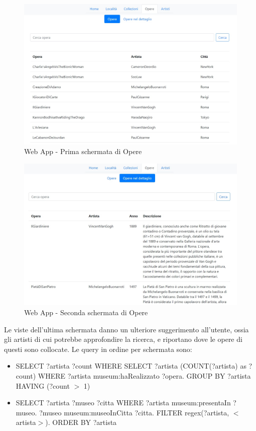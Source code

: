 \documentclass[12pt]{article}
\begin{document}
\begin{figure}[!h]
   \centering
   \includegraphics[scale=0.6]{fig/Schermata 4.1 webapp.jpg}
   \caption{Web App - Prima schermata di Opere}\label{fig:picture}
\end{figure}
\begin{figure}[!ht]
   \centering
   \includegraphics[scale=0.6]{fig/Schermata 4.2 webapp.jpg}
   \caption{Web App - Seconda schermata di Opere}\label{fig:picture}
\end{figure}

\newpage
Le viste dell’ultima schermata danno un ulteriore suggerimento all’utente, ossia gli artisti di cui potrebbe approfondire la ricerca, e riportano dove le opere di questi sono collocate.
Le query in ordine per schermata sono:

\begin{itemize}
 \item SELECT ?artista ?count WHERE{ SELECT ?artista (COUNT(?artista) as ?count) WHERE { ?artista museum:haRealizzato ?opera.} } GROUP BY ?artista HAVING (?count $>$ 1)
 \item SELECT ?artista ?museo ?citta WHERE {?artista museum:presentaIn ?museo. ?museo museum:museoInCitta ?citta. FILTER regex(?artista, $<$artista$>$).} ORDER BY ?artista
\end{itemize} 
\end{document}

